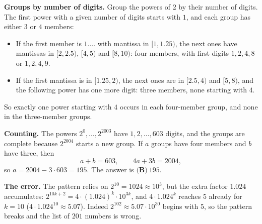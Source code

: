 \textbf{Groups by number of digits.} Group the powers of $2$ by their number of digits. The first power with a given number of digits starts with $1$, and each group has either $3$ or $4$ members:
\begin{itemize}
\item If the first member is $1.\ldots$ with mantissa in $[1,1.25)$, the next ones have mantissas in $[2,2.5)$, $[4,5)$ and $[8,10)$: four members, with first digits $1,2,4,8$ or $1,2,4,9$.
\item If the first mantissa is in $[1.25,2)$, the next ones are in $[2.5,4)$ and $[5,8)$, and the following power has one more digit: three members, none starting with $4$.
\end{itemize}
So exactly one power starting with $4$ occurs in each four-member group, and none in the three-member groups.

\textbf{Counting.} The powers $2^0,\ldots,2^{2003}$ have $1,2,\ldots,603$ digits, and the groups are complete because $2^{2004}$ starts a new group. If $a$ groups have four members and $b$ have three, then
\[a+b=603,\qquad4a+3b=2004,\]
so $a=2004-3\cdot603=195$. The answer is $\boxed{\textbf{(B)}\ 195}$.

\textbf{The error.} The pattern relies on $2^{10}=1024\approx10^3$, but the extra factor $1.024$ accumulates: $2^{10k+2}=4\cdot(1.024)^k\cdot10^{3k}$, and $4\cdot1.024^{k}$ reaches $5$ already for $k=10$ ($4\cdot1.024^{10}\approx5.07$). Indeed $2^{102}\approx5.07\cdot10^{30}$ begins with $5$, so the pattern breaks and the list of $201$ numbers is wrong.
